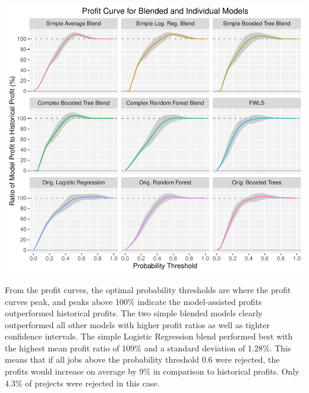 \documentclass[]{elsarticle} %
\makeatletter
\def\maxwidth{\ifdim\Gin@nat@width>\linewidth\linewidth
\else\Gin@nat@width\fi}
\let\Oldincludegraphics\includegraphics
\renewcommand{\includegraphics}[1]{\Oldincludegraphics[width=\maxwidth]{#1}}
\makeatother
\begin{document}
\includegraphics{Consulting_Profitability_Paper_files/figure-latex/profit_curve-1.pdf}

From the profit curves, the optimal probability thresholds are where the
profit curves peak, and peaks above 100\% indicate the model-assisted
profits outperformed historical profits. The two simple blended models
clearly outperformed all other models with higher profit ratios as well
as tighter confidence intervals. The simple Logistic Regression blend
performed best with the highest mean profit ratio of 109\% and a
standard deviation of 1.28\%. This means that if all jobs above the
probability threshold 0.6 were rejected, the profits would increase on
average by 9\% in comparison to historical profits. Only 4.3\% of
projects were rejected in this case.
\end{document}
